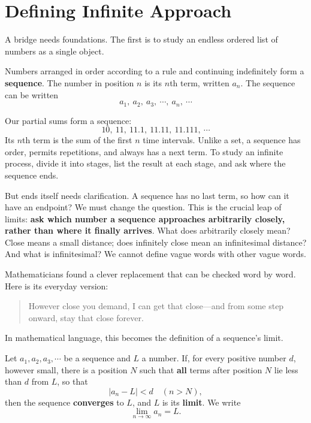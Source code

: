 \section{Defining Infinite Approach}

A bridge needs foundations. The first is to study an endless ordered list of numbers as a single object.

\begin{dingyi}[Sequence]
Numbers arranged in order according to a rule and continuing indefinitely form a \textbf{sequence}. The number in position $n$ is its $n$th term, written $a_n$. The sequence can be written
\[
a_1,\ a_2,\ a_3,\ \cdots,\ a_n,\ \cdots
\]
\end{dingyi}

Our partial sums form a sequence:
\[
10,\ 11,\ 11.1,\ 11.11,\ 11.111,\ \cdots
\]
Its $n$th term is the sum of the first $n$ time intervals. Unlike a set, a sequence has order, permits repetitions, and always has a next term. To study an infinite process, divide it into stages, list the result at each stage, and ask where the sequence ends.

But ends itself needs clarification. A sequence has no last term, so how can it have an endpoint? We must change the question. This is the crucial leap of limits: \textbf{ask which number a sequence approaches arbitrarily closely, rather than where it finally arrives}. What does arbitrarily closely mean? Close means a small distance; does infinitely close mean an infinitesimal distance? And what is infinitesimal? We cannot define vague words with other vague words.

Mathematicians found a clever replacement that can be checked word by word. Here is its everyday version:

\begin{quote}
However close you demand, I can get that close---and from some step onward, stay that close forever.
\end{quote}

In mathematical language, this becomes the definition of a sequence's limit.

\begin{dingyi}
Let $a_1,a_2,a_3,\cdots$ be a sequence and $L$ a number. If, for every positive number $d$, however small, there is a position $N$ such that \textbf{all} terms after position $N$ lie less than $d$ from $L$, so that
\[
|a_n-L|<d \quad (n>N),
\]
then the sequence \textbf{converges} to $L$, and $L$ is its \textbf{limit}. We write
\[
\lim_{n\to\infty}a_n=L.
\]
\end{dingyi}

